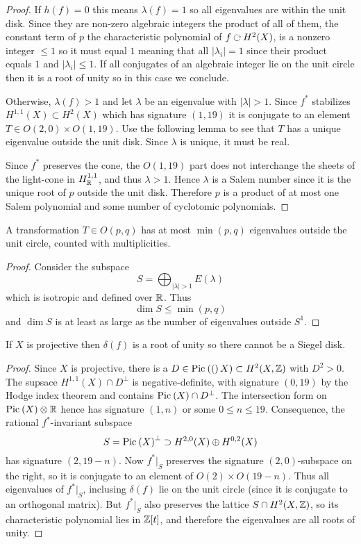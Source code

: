 \documentclass[12pt]{article}
\begin{document}
\begin{proof}
If $h(f) = 0$ this means $\lambda(f) = 1$ so all eigenvalues are within the unit disk. Since they are non-zero algebraic integers the product of all of them, the constant term of $p$ the characteristic polynomial of $f \acts H^2(X)$, is a nonzero integer $\le 1$ so it must equal $1$ meaning that all $|\lambda_i| = 1$ since their product equals $1$ and $|\lambda_i| \le 1$. If all conjugates of an algebraic integer lie on the unit circle then it is a root of unity so in this case we conclude.
\par 
Otherwise, $\lambda(f) > 1$ and let $\lambda$ be an eigenvalue with $|\lambda| > 1$. Since $f^*$ stabilizes $H^{1,1}(X) \subset H^2(X)$ which has signature $(1,19)$ it is conjugate to an element $T \in O(2,0) \times O(1,19)$. Use the following lemma to see that $T$ has a unique eigenvalue outside the unit disk. Since $\lambda$ is unique, it must be real.
\par 
Since $f^*$ preserves the \Kahler cone, the $O(1,19)$ part does not interchange the sheets of the light-cone in $H^{1,1}_{\mathbb{R}}$, and thus $\lambda > 1$. Hence $\lambda$ is a Salem number since it is the unique root of $p$ outside the unit disk. Therefore $p$ is a product of at most one Salem polynomial and some number of cyclotomic polynomials.
\end{proof}

\begin{lemma}
A transformation $T \in O(p,q)$ has at most $\min{(p,q)}$ eigenvalues outside the unit circle, counted with multiplicities.
\end{lemma}

\begin{proof}
Consider the subspace
\[ S = \bigoplus_{|\lambda| > 1} E(\lambda) \]
which is isotropic and defined over $\mathbb{R}$. Thus
\[ \dim{S} \le \min{(p,q)} \]
and $\dim{S}$ is at least as large as the number of eigenvalues outside $S^1$.
\end{proof}

\begin{prop}
If $X$ is projective then $\delta(f)$ is a root of unity so there cannot be a Siegel disk. 
\end{prop}

\begin{proof}
Since $X$ is projective, there is a $D \in \mathrm{Pic}^{} \left( ( \right)X) \subset H^2(X, \mathbb{Z})$ with $D^2 > 0$. The supsace $H^{1,1}(X) \cap D^{\perp}$ is negative-definite, with signature $(0,19)$ by the Hodge index theorem and contains $\mathrm{Pic}^{} \left( X \right) \cap D^{\perp}$. The intersection form on $\mathrm{Pic}^{} \left( X \right) \otimes \mathbb{R}$ hence has signature $(1,n)$ or some $0 \le n \le 19$. Consequence, the rational $f^*$-invariant subspace
\[ S = \mathrm{Pic}^{} \left( X \right)^{\perp} \supset H^{2,0}(X) \oplus H^{0,2}(X) \]
has signature $(2, 19-n)$. Now $f^*|_S$ preserves the signature $(2,0)$-subspace on the right, so it is conjugate to an element of $O(2) \times O(19-n)$. Thus all eigenvalues of $f^*|_S$, inclusing $\delta(f)$ lie on the unit circle (since it is conjugate to an orthogonal matrix). But $f^*|_S$ also preserves the lattice $S \cap H^2(X, \mathbb{Z})$, so its characteristic polynomial lies in $\mathbb{Z}[t]$, and therefore the eigenvalues are all roots of unity.
\end{proof}
\end{document}
